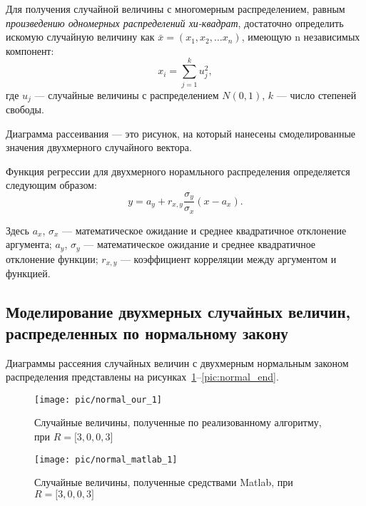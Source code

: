 \newpage

Для получения случайной величины с многомерным распределением, 
равным \textit{произведению одномерных распределений хи-квадрат}, достаточно
определить искомую случайную величину как $ \bar x = (x_1, x_2, \dots x_n) $,
имеющую n независимых компонент:
\begin{equation*}
  x_i = \sum_{j = 1}^{k}{u^{2}_{j}},
\end{equation*}
\noindent где $ u_{j} $ --- случайные величины с распределением $ N(0,1) $,
$ k $ --- число степеней свободы.

Диаграмма рассеивания --- это рисунок, на который нанесены смоделированные значения
двухмерного случайного вектора.

Функция регрессии для двухмерного норамльного распределения определяется 
следующим образом:
\begin{equation*}
y = a_y + r_{x,y} \dfrac{\sigma_y}{\sigma_x}(x - a_x).
\end{equation*}

Здесь $ a_x $, $ \sigma_x $ --- математическое ожидание и среднее квадратичное отклонение аргумента;
$ a_y $, $ \sigma_y $ --- математическое ожидание и среднее квадратичное отклонение функции;
$ r_{x,y} $ --- коэффициент корреляции между аргументом и функцией.

\newpage 

\subsection{Моделирование двухмерных случайных величин, \\ распределенных по нормальному закону}

Диаграммы рассеяния случайных величин с двухмерным нормальным законом
распределения представлены на рисунках~\ref{pic:normal_start}--\ref{pic:normal_end}.

\begin{figure}[h!]
  \begin{minipage}[h!]{0.47\linewidth}
    \texttt{[image: pic/normal\_our\_1]}
    \caption{Случайные величины, полученные по реализованному алгоритму,
      при $ R = \big[3, 0, 0, 3 \big] $
  }
    \label{pic:normal_start}
  \end{minipage}
  \hfill
  \begin{minipage}[h!]{0.47\linewidth}
    \vspace{4mm}
    \texttt{[image: pic/normal\_matlab\_1]}
    \caption{Случайные величины, полученные средствами Matlab,
      при $ R = \big[3, 0, 0, 3 \big] $
    }
  \end{minipage}
\end{figure}

